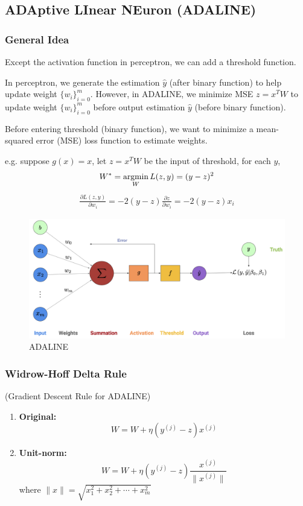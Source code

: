 \documentclass[11pt,a4paper]{article}
\newcommand{\argmin}{\operatornamewithlimits{argmin}}
\begin{document}
\subsection{ADAptive LInear NEuron
(ADALINE)}
\subsubsection{General Idea}
Except the activation function in perceptron, we can add a threshold function.

In perceptron, we generate the estimation $\hat{y}$ (after binary function) to help update weight $\{w_i\}_{i=0}^m$. However, in ADALINE, we minimize MSE $z=x^TW$ to update weight $\{w_i\}_{i=0}^m$ before output estimation $\hat{y}$ (before binary function).

Before entering threshold (binary function), we want to minimize a mean-
squared error (MSE) loss
function to estimate weights.

e.g. suppose $g(x)=x$, let $z=x^TW$ be the input of threshold, for each $y$,$$W^*=\argmin_{W}L(z,y)=(y-z)^2$$
\begin{equation}
    \begin{aligned}
        \frac{\partial L(z,y)}{\partial w_i}=-2(y-z)\frac{\partial z}{\partial w_i}=-2(y-z)x_i
    \end{aligned}
    \nonumber
\end{equation}

\begin{center}\begin{figure}[htbp]
    \centering
    \includegraphics[scale=0.2]{adaline.png}
    \caption{ADALINE}
    \label{}
\end{figure}\end{center}

\subsubsection{Widrow-Hoff Delta Rule}
(Gradient Descent Rule for ADALINE)
\begin{enumerate}[$\bullet$]
    \item \textbf{Original: }$$W=W+\eta(y^{(j)}-z)x^{(j)}$$
    \item \textbf{Unit-norm: }$$W=W+\eta(y^{(j)}-z)\frac{x^{(j)}}{\|x^{(j)}\|}$$
    where $\|x\|=\sqrt{x_1^2+x_2^2+\cdots+x_m^2}$
\end{enumerate}
\end{document}
